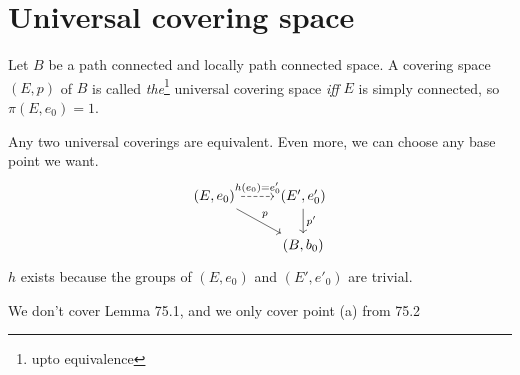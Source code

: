 \setcounter{section}{74}
\section{Universal covering space}

\begin{definition}
    Let $B$ be a path connected and locally path connected space.
    A covering space $(E, p)$ of $B$ is called \emph{the}\footnote{upto equivalence } universal covering space \emph{iff} $E$ is simply connected, so $\pi(E, e_0) = 1$.
\end{definition}
\begin{remark}
    Any two universal coverings are equivalent.
    Even more, we can choose any base point we want.
    \[
        \begin{tikzcd}
            (E, e_0) \arrow[dr, "p"] \arrow[r, dashed, "h(e_0) = e_0'"]& (E', e_0') \arrow[d, "p'"]\\
                                    & (B, b_0)
        \end{tikzcd}
    \]
    $h$ exists because the groups of $(E, e_0)$ and $(E', e'_0)$ are trivial.
\end{remark}

\begin{remark}
    We don't cover Lemma 75.1, and we only cover point (a) from 75.2
\end{remark}

